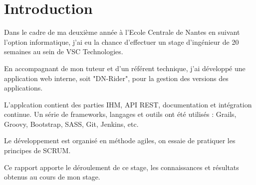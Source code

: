 \chapter{Introduction}
\label{chap:Introduction}

Dans le cadre de ma deuxième année à l'Ecole Centrale de Nantes en suivant l'option informatique,
j'ai eu la chance d'effectuer un stage d'ingénieur de 20 semaines au sein de VSC Technologies.

En accompagnant de mon tuteur et d'un référent technique,
j'ai développé une application web interne, soit "DN-Rider", pour la gestion des versions des applications.

L'applcation contient des parties IHM, API REST, documentation et intégration continue.
Un série de frameworks, langages et outils ont été utilisés : Grails, Groovy, Bootstrap, SASS, Git, Jenkins, etc.

Le développement est organisé en méthode agiles, on essaie de pratiquer les principes de SCRUM.

Ce rapport apporte le déroulement de ce stage, les connaissances et résultats obtenus au cours de mon stage.
